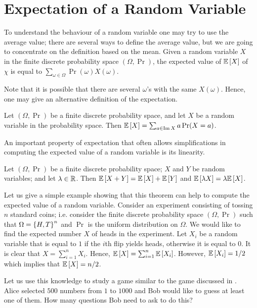 \chapter{Expectation of a Random Variable}
To understand the behaviour of a random variable one may try to use the average
value; there are several ways to define the average value, but we are going to
concentrate on the definition based on the mean. Given a random variable $X$
in the finite discrete probability space $(\Omega, \Pr)$, the expected value of
$\mathbb{E}\left[X\right]$ of $\chi$ is equal to $\sum_{\omega \in \Omega}
\Pr(\omega) X(\omega)$.

Note that it is possible that there are several $\omega$'s with the same
$X(\omega)$. Hence, one may give an alternative definition of the expectation.
\begin{theorem}
  Let $(\Omega, \Pr)$ be a finite discrete probability space, and let $X$ be a
  random variable in the probability space. Then $\mathbb{E}\left[X\right] = 
  \sum_{a \in \operatorname{Im} X} a\Pr(X = a)$.
\end{theorem}

An important property of expectation that often allows simplifications in
computing the expected value of a random variable is its linearity.
\begin{theorem}
  Let $(\Omega, \Pr)$ be a finite discrete probability space; $X$ and
  $Y$ be random variables; and let $\lambda \in {\mathbb{R}}$.
  Then $\mathbb{E}\left[X + Y\right] = \mathbb{E}\left[X\right] + \mathbb{E}\left[Y\right]$ and
  $\mathbb{E}\left[\lambda X\right] = \lambda \mathbb{E}\left[X\right]$.
\end{theorem}
Let us give a simple example showing that this theorem can help to compute the
expected value of a random variable. Consider an experiment consisting of
tossing $n$ standard coins; i.e. consider the finite discrete probability space
$(\Omega, \Pr)$ such that $\Omega = \set{H, T}^n$ and $\Pr$ is the uniform
distribution on $\Omega$. We would like to find the expected number $X$ of heads
in the experiment. Let $X_i$ be a random variable that is equal to $1$ if the
$i$th flip yields heads, otherwise it is equal to $0$. It is clear that $X =
\sum_{i = 1}^n X_i$. Hence, $\mathbb{E}\left[X\right] = \sum_{i = 1}^n \mathbb{E}\left[X_i\right]$.
However, $\mathbb{E}\left[X_i\right] = 1 / 2$ which implies that $\mathbb{E}\left[X\right] = n / 2$.

Let us use this knowledge to study a game similar to the game discussed in
. Alice selected $500$ numbers from $1$ to
$1000$ and Bob would like to guess at least one of them. How many questions Bob
need to ask to do this?

